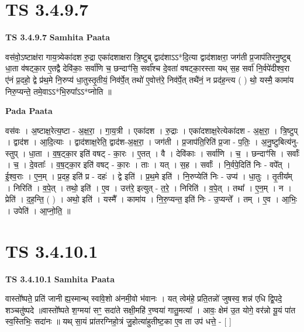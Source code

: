 \documentclass[17pt]{extarticle}
\begin{document}
\section*{ TS 3.4.9.7 }

\textbf{TS 3.4.9.7 } \newline
\textbf{Samhita Paata} \newline

वस॑वो॒ऽष्टाक्ष॑रा गाय॒त्र्येका॑दश रु॒द्रा एका॑दशाक्षरा त्रि॒ष्टुब् द्वाद॑शाऽऽ*दि॒त्या द्वाद॑शाक्षरा॒ जग॑ती प्र॒जाप॑तिरनु॒ष्टुब् धा॒ता व॑षट्का॒र ए॒तद्वै देवि॑काः॒ सर्वा॑णि च॒ छन्दाꣳ॑सि॒ सर्वा᳚श्च दे॒वता॑ वषट्का॒रस्ता यथ् स॒ह सर्वा॑ नि॒र्वपे॑दीश्व॒रा ए॑नं प्र॒दहो॒ द्वे प्र॑थ॒मे नि॒रुप्य॑ धा॒तुस्तृ॒तीयं॒ निव॑र्पे॒त् तथो॑ ए॒वोत्त॑रे॒ निव॑र्पे॒त् तथै॑नं॒ न प्रद॑ह॒न्त्य ( ) थो॒ यस्मै॒ कामा॑य निरु॒प्यन्ते॒ तमे॒वाऽऽ*भि॒रुपा᳚ऽऽ*प्नोति ॥ \newline

\textbf{Pada Paata} \newline

वस॑वः । अ॒ष्टाक्ष॒रेत्य॒ष्टा - अ॒क्ष॒रा॒ । गा॒य॒त्री । एका॑दश । रु॒द्राः । एका॑दशाक्ष॒रेत्येका॑दश - अ॒क्ष॒रा॒ । त्रि॒ष्टुप् । द्वाद॑श । आ॒दि॒त्याः । द्वाद॑शाक्ष॒रेति॒ द्वाद॑श-अ॒क्ष॒रा॒ । जग॑ती । प्र॒जाप॑ति॒रिति॑ प्र॒जा - प॒तिः॒ । अ॒नु॒ष्टुबित्य॑नु-स्तुप् । धा॒ता । व॒ष॒ट्का॒र इति॑ वषट् - का॒रः । ए॒तत् । वै । देवि॑काः । सर्वा॑णि । च॒ । छन्दाꣳ॑सि । सर्वाः᳚ । च॒ । दे॒वताः᳚ । व॒ष॒ट्का॒र इति॑ वषट् - का॒रः । ताः । यत् । स॒ह । सर्वाः᳚ । नि॒र्वपे॒दिति॑ निः - वपे᳚त् । ई॒श्व॒राः । ए॒न॒म् । प्र॒दह॒ इति॑ प्र - दहः॑ । द्वे इति॑ । प्र॒थ॒मे इति॑ । नि॒रुप्येति॑ निः - उप्य॑ । धा॒तुः । तृ॒तीय᳚म् । निरिति॑ । व॒पे॒त् । तथो॒ इति॑ । ए॒व । उत्त॑रे॒ इत्युत् - त॒रे॒ । निरिति॑ । व॒पे॒त् । तथा᳚ । ए॒न॒म् । न । प्रेति॑ । द॒ह॒न्ति॒ ( ) । अथो॒ इति॑ । यस्मै᳚ । कामा॑य । नि॒रु॒प्यन्त॒ इति॑ निः - उ॒प्यन्ते᳚ । तम् । ए॒व । आ॒भिः॒ । उपेति॑ । आ॒प्नो॒ति॒ ॥  \newline




\section*{ TS 3.4.10.1 }

\textbf{TS 3.4.10.1 } \newline
\textbf{Samhita Paata} \newline

वास्तो᳚ष्पते॒ प्रति॑ जानी ह्य॒स्मान्थ् स्वा॑वे॒शो अ॑नमी॒वो भ॑वानः । यत् त्वेम॑हे॒ प्रति॒तन्नो॑ जुषस्व॒ शन्न॑ एधि द्वि॒पदे॒ शञ्चतु॑ष्पदे ॥वास्तो᳚ष्पते श॒ग्मया॑ सꣳ॒॒ सदा॑ते सक्षी॒महि॑ र॒ण्वया॑ गातु॒मत्या᳚ । आवः॒ क्षेम॑ उ॒त योगे॒ वर॑न्नो यू॒यं पा॑त स्व॒स्तिभिः॒ सदा॑नः ॥ यथ् सा॒यं प्रा॑तरग्निहो॒त्रं जु॒होत्या॑हुतीष्ट॒का ए॒व ता उप॑ धत्ते॒ - [  ] \newline
\end{document}
